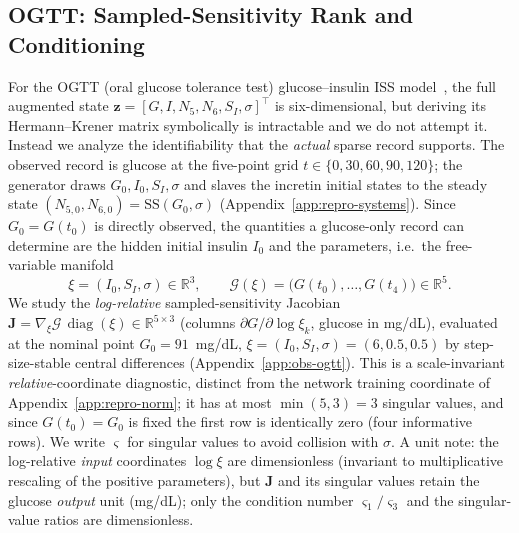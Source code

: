 \subsection{OGTT: Sampled-Sensitivity Rank and Conditioning}
\label{subsec:ident-ogtt}
For the OGTT (oral glucose tolerance test) glucose--insulin ISS model~\cite{ha2024iss,ha2025disposition}, the full augmented state $\mathbf{z}=[G,I,N_5,N_6,S_I,\sigma]^\top$ is six-dimensional, but deriving its Hermann--Krener matrix symbolically is intractable and we do not attempt it. Instead we analyze the identifiability that the \emph{actual} sparse record supports. The observed record is glucose at the five-point grid $t\in\{0,30,60,90,120\}$; the generator draws $G_0,I_0,S_I,\sigma$ and slaves the incretin initial states to the steady state $(N_{5,0},N_{6,0})=\mathrm{SS}(G_0,\sigma)$ (Appendix~\ref{app:repro-systems}). Since $G_0=G(t_0)$ is directly observed, the quantities a glucose-only record can determine are the hidden initial insulin $I_0$ and the parameters, i.e.\ the free-variable manifold
\begin{equation*}
\xi=(I_0,S_I,\sigma)\in\mathbb{R}^3, \qquad \mathcal{G}(\xi)=\big(G(t_0),\ldots,G(t_4)\big)\in\mathbb{R}^5 .
\end{equation*}
We study the \emph{log-relative} sampled-sensitivity Jacobian $\mathbf{J}=\nabla_\xi\mathcal{G}\,\operatorname{diag}(\xi)\in\mathbb{R}^{5\times3}$ (columns $\partial G/\partial\log\xi_k$, glucose in mg/dL), evaluated at the nominal point $G_0=91$~mg/dL, $\xi=(I_0,S_I,\sigma)=(6,0.5,0.5)$ by step-size-stable central differences (Appendix~\ref{app:obs-ogtt}). This is a scale-invariant \emph{relative}-coordinate diagnostic, distinct from the network training coordinate of Appendix~\ref{app:repro-norm}; it has at most $\min(5,3)=3$ singular values, and since $G(t_0)=G_0$ is fixed the first row is identically zero (four informative rows). We write $\varsigma$ for singular values to avoid collision with $\sigma$. A unit note: the log-relative \emph{input} coordinates $\log\xi$ are dimensionless (invariant to multiplicative rescaling of the positive parameters), but $\mathbf{J}$ and its singular values retain the glucose \emph{output} unit (mg/dL); only the condition number $\varsigma_1/\varsigma_3$ and the singular-value ratios are dimensionless.


